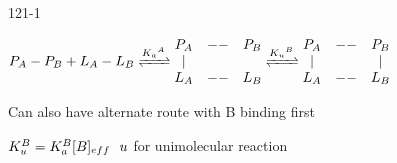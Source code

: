 \begin{mitframe}{121-1}
\begin{listone}
\begin{listtwo}
\begin{listthree}
                \end{listthree}    
            	\item $\p_{\helmholtz}-\p_{\exergy}+\length_{\helmholtz}-\length_{\exergy}\xrightleftharpoons{{\dilfac_{\activity}}^{\helmholtz}}\begin{matrix}\p_{\helmholtz}&--&\p_{\exergy}\\ | & &  \\ \length_{\helmholtz}&--&\length_{\exergy}\\ \end{matrix}\xrightleftharpoons{{\dilfac_{\forcepot}}^{\exergy}}\begin{matrix}\p_{\helmholtz}&--&\p_{\exergy}\\ | & & | \\ \length_{\helmholtz}&--&\length_{\exergy}\\ \end{matrix}$  
                \begin{listthree}
                	\item Can also have alternate route  with B binding first
                    \item $\dilfac_{\forcepot}^{\exergy}=\dilfac_{\activity}^{\exergy}[\exergy]_{eff}~~\forcepot$ for unimolecular reaction
                \end{listthree}             
            \end{listtwo}
\end{listone}
\end{mitframe}